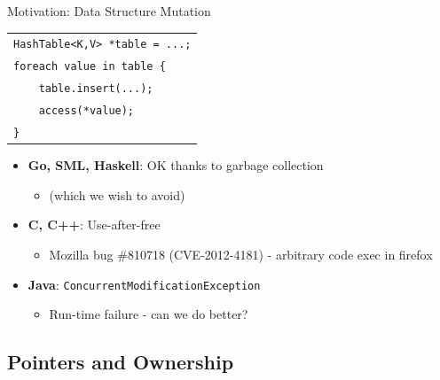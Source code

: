 \documentclass[xcolor=dvipsnames]{beamer}
\begin{document}
\newcommand\hashtableexample{\begin{tabular}{l}
		\texttt{HashTable<K,V> *table = ...;} \\
		\texttt{foreach value in table \{ \hilight{darkcyan}{// create alias into table}} \\
		\texttt{~~~~table.insert(...); \hilight{darkcyan}{// might reallocate bucket array}} \\
		\texttt{~~~~access(*value);} \\
\texttt{\}}
	\end{tabular} }

\begin{frame}{Motivation: Data Structure Mutation}
	\hashtableexample
	\pause
	\linegap

	\begin{itemize}
		\item \textbf{Go, SML, Haskell}: OK thanks to garbage collection
			\begin{itemize}
				\item (which we wish to avoid)
			\end{itemize}
		\pause
		\item \textbf{C, C++}: Use-after-free
			\begin{itemize}
				\item Mozilla bug \#810718 (CVE-2012-4181) - arbitrary code exec in firefox
			\end{itemize}
		\pause
		\item \textbf{Java}: \texttt{ConcurrentModificationException}
			\begin{itemize}
				\item Run-time failure - can we do better?
			\end{itemize}
	\end{itemize}
\end{frame}

\subsection{Pointers and Ownership}
\end{document}

